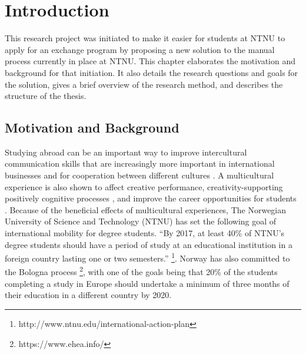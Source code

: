 
\chapter{Introduction}\label{chap:1}

This research project was initiated to make it easier for students at NTNU to apply for an exchange program by proposing a new solution to the manual process currently in place at NTNU. This chapter elaborates the motivation and background for that initiation. It also details the research questions and goals for the solution, gives a brief overview of the research method, and describes the structure of the thesis.

\section{Motivation and Background}
Studying abroad can be an important way to improve intercultural communication skills that are increasingly more important in international businesses and for cooperation between different cultures \cite{williams2005exploring}. A multicultural experience is also shown to affect creative performance, creativity-supporting positively cognitive processes \cite{leung2008multicultural}, and improve the career opportunities for students \cite{brandenburg2014erasmus}. Because of the beneficial effects of multicultural experiences, The Norwegian University of Science and Technology (NTNU) has set the following goal of international mobility for degree students. \enquote{By 2017, at least 40\% of NTNU's degree students should have a period of study at an educational institution in a foreign country lasting one or two semesters.} \footnote{http://www.ntnu.edu/international-action-plan}. Norway has also committed to the Bologna process \footnote{https://www.ehea.info/}, with one of the goals being that 20\% of the students completing a study in Europe should undertake a minimum of three months of their education in a different country by 2020.

